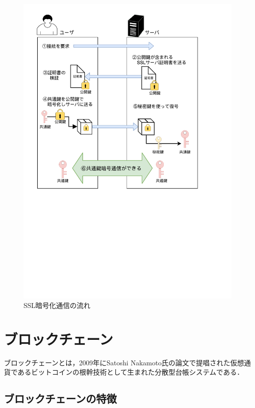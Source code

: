 \documentclass[a4j,12pt]{jsarticle}
\begin{document}
\begin{figure}[H]
\centering
\includegraphics[mediaboxonly=/CropBox,width=14cm]{SSL.pdf}
\caption{SSL暗号化通信の流れ}
\label{fig:no}
\end{figure} 



\newpage
\section{ブロックチェーン}
ブロックチェーンとは，2009年にSatoshi Nakamoto氏の論文\cite{satoshi}で提唱された仮想通貨であるビットコインの根幹技術として生まれた分散型台帳システムである．


\subsection{ブロックチェーンの特徴}
\end{document}

